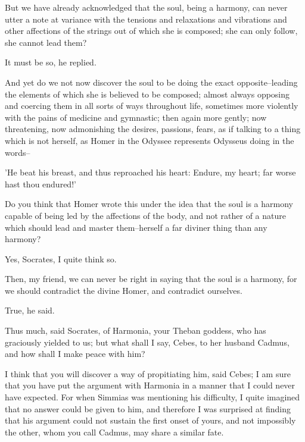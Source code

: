 But we have already acknowledged that the soul, being a harmony, can
never utter a note at variance with the tensions and relaxations and
vibrations and other affections of the strings out of which she is
composed; she can only follow, she cannot lead them?

It must be so, he replied.

And yet do we not now discover the soul to be doing the exact
opposite--leading the elements of which she is believed to be composed;
almost always opposing and coercing them in all sorts of ways throughout
life, sometimes more violently with the pains of medicine and gymnastic;
then again more gently; now threatening, now admonishing the desires,
passions, fears, as if talking to a thing which is not herself, as Homer
in the Odyssee represents Odysseus doing in the words--

'He beat his breast, and thus reproached his heart: Endure, my heart;
far worse hast thou endured!'

Do you think that Homer wrote this under the idea that the soul is a
harmony capable of being led by the affections of the body, and not
rather of a nature which should lead and master them--herself a far
diviner thing than any harmony?

Yes, Socrates, I quite think so.

Then, my friend, we can never be right in saying that the soul is a
harmony, for we should contradict the divine Homer, and contradict
ourselves.

True, he said.

Thus much, said Socrates, of Harmonia, your Theban goddess, who has
graciously yielded to us; but what shall I say, Cebes, to her husband
Cadmus, and how shall I make peace with him?

I think that you will discover a way of propitiating him, said Cebes; I
am sure that you have put the argument with Harmonia in a manner that
I could never have expected. For when Simmias was mentioning his
difficulty, I quite imagined that no answer could be given to him, and
therefore I was surprised at finding that his argument could not sustain
the first onset of yours, and not impossibly the other, whom you call
Cadmus, may share a similar fate.

